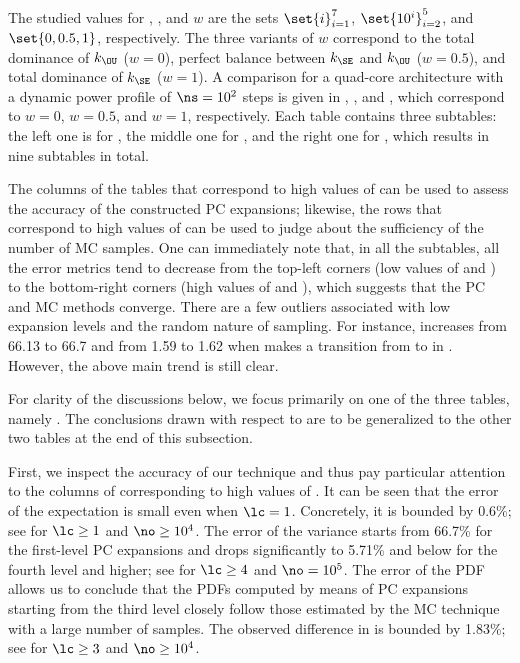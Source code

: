 The studied values for \lc, \no, and $w$ are the sets $\set{i}_{i = 1}^7$,
$\set{10^i}_{i = 2}^5$, and $\set{0, 0.5, 1}$, respectively. The three variants
of $w$ correspond to the total dominance of $k_\OU$ ($w = 0$), perfect balance
between $k_\SE$ and $k_\OU$ ($w = 0.5$), and total dominance of $k_\SE$ ($w =
1$). A comparison for a quad-core architecture with a dynamic power profile of
$\ns = 10^2$ steps is given in ,
, and ,
which correspond to $w = 0$, $w = 0.5$, and $w = 1$, respectively. Each table
contains three subtables: the left one is for \error{\expectation}, the middle
one for \error{\variance}, and the right one for , which results in
nine subtables in total.

The columns of the tables that correspond to high values of \no can be used to
assess the accuracy of the constructed \ac{PC} expansions; likewise, the rows
that correspond to high values of \lc can be used to judge about the sufficiency
of the number of \ac{MC} samples. One can immediately note that, in all the
subtables, all the error metrics tend to decrease from the top-left corners (low
values of \lc and \no) to the bottom-right corners (high values of \lc and \no),
which suggests that the \ac{PC} and \ac{MC} methods converge. There are a few
outliers associated with low expansion levels and the random nature of sampling.
For instance, \error{\variance} increases from 66.13 to 66.7 and  from
1.59 to 1.62 when \no makes a transition from  to  in
. However, the above main trend is still
clear.

For clarity of the discussions below, we focus primarily on one of the three
tables, namely . The conclusions drawn with
respect to  are to be generalized to the
other two tables at the end of this subsection.

First, we inspect the accuracy of our technique and thus pay particular
attention to the columns of  corresponding to
high values of \no. It can be seen that the error of the expectation is small
even when $\lc = 1$. Concretely, it is bounded by 0.6\%; see
\error{\expectation} for $\lc \geq 1$ and $\no \geq 10^4$. The error of the
variance starts from 66.7\% for the first-level \ac{PC} expansions and drops
significantly to 5.71\% and below for the fourth level and higher; see
\error{\variance} for $\lc \geq 4$ and $\no = 10^5$. The error of the \ac{PDF}
allows us to conclude that the \acp{PDF} computed by means of \ac{PC} expansions
starting from the third level closely follow those estimated by the \ac{MC}
technique with a large number of samples. The observed difference in
 is bounded by 1.83\%; see  for $\lc
\geq 3$ and $\no \geq 10^4$.

